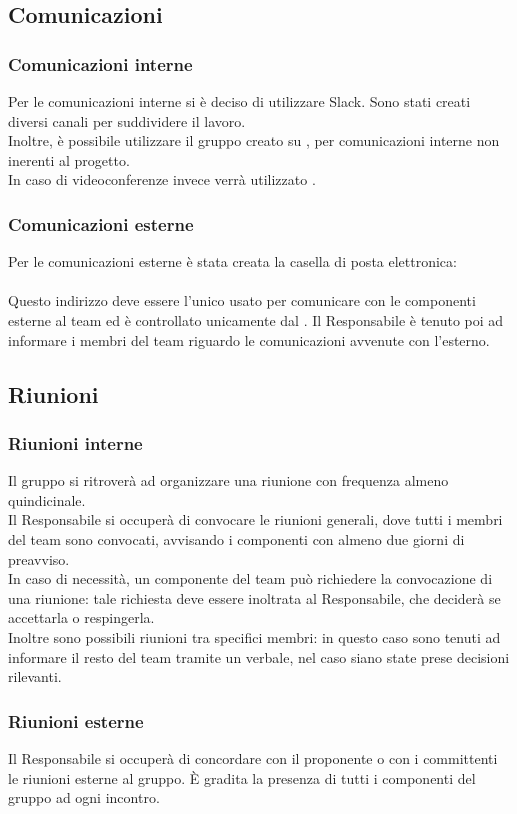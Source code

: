 \subsection{Comunicazioni}
	\subsubsection{Comunicazioni interne}
	Per le comunicazioni interne si è deciso di utilizzare Slack. Sono stati creati diversi canali per suddividere il lavoro. \\
	Inoltre, è possibile utilizzare il gruppo creato su , per comunicazioni interne non inerenti al progetto. \\
	In caso di videoconferenze invece verrà utilizzato .
	\subsubsection{Comunicazioni esterne}
	Per le comunicazioni esterne è stata creata la casella di posta elettronica: \\
	 \\
	Questo indirizzo deve essere l'unico usato per comunicare con le componenti esterne al team ed è controllato unicamente dal . Il Responsabile è tenuto poi ad informare i membri del team riguardo le comunicazioni avvenute con l'esterno.
\subsection{Riunioni}
	\subsubsection{Riunioni interne}
	Il gruppo si ritroverà ad organizzare una riunione con frequenza almeno quindicinale. \\
	Il Responsabile si occuperà di convocare le riunioni generali, dove tutti i membri del team sono convocati, avvisando i componenti con almeno due giorni di preavviso. \\
	In caso di necessità, un componente del team può richiedere la convocazione di una riunione: tale richiesta deve essere inoltrata al Responsabile, che deciderà se accettarla o respingerla. \\
	Inoltre sono possibili riunioni tra specifici membri: in questo caso sono tenuti ad informare il resto del team tramite un verbale, nel caso siano state prese decisioni rilevanti. \\
	\subsubsection{Riunioni esterne}
	Il Responsabile si occuperà di concordare con il proponente o con i committenti le riunioni esterne al gruppo.
	È gradita la presenza di tutti i componenti del gruppo ad ogni incontro.
	